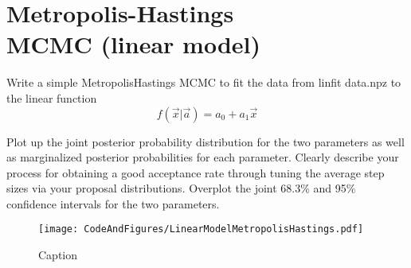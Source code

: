 \section{Metropolis-Hastings \\ MCMC (linear model)}

Write a simple MetropolisHastings MCMC to fit the data from linfit data.npz to the linear function
\begin{equation}
    f(\Vec{x}|\Vec{a})=a_0 + a_1\Vec{x}
\end{equation}

Plot up the joint posterior probability distribution for the two parameters as well as marginalized posterior probabilities for each parameter. Clearly describe your process for obtaining a
good acceptance rate through tuning the average step sizes via your proposal distributions.
Overplot the joint 68.3\% and 95\% confidence intervals for the two parameters.

\begin{figure}
    \centering
    \texttt{[image: CodeAndFigures/LinearModelMetropolisHastings.pdf]}
    \caption{Caption}
    \label{fig:LinearHastings}
\end{figure}